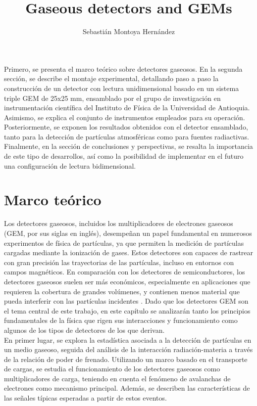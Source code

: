 \documentclass{article}
\title{\textbf{Gaseous detectors and GEMs} }
\author{Sebastián Montoya Hernández}
\begin{document}
\maketitle 
\setcounter{section}{0}
\noindent Primero, se presenta el marco teórico sobre detectores gaseosos. En la segunda sección, se describe el montaje experimental, detallando paso a paso la construcción de un detector con lectura unidimensional basado en un sistema triple GEM de 25x25 mm, ensamblado por el grupo de investigación en instrumentación científica del Instituto de Física de la Universidad de Antioquia. Asimismo, se explica el conjunto de instrumentos empleados para su operación.\\

\noindent Posteriormente, se exponen los resultados obtenidos con el detector ensamblado, tanto para la detección de partículas atmosféricas como para fuentes radiactivas. Finalmente, en la sección de conclusiones y perspectivas, se resalta la importancia de este tipo de desarrollos, así como la posibilidad de implementar en el futuro una configuración de lectura bidimensional.

\newpage
\section{Marco teórico}

\noindent Los detectores gaseosos, incluidos los multiplicadores de electrones gaseosos (GEM, por sus siglas en inglés), desempeñan un papel fundamental en numerosos experimentos de física de partículas, ya que permiten la medición de partículas cargadas mediante la ionización de gases. Estos detectores son capaces de rastrear con gran precisión las trayectorias de las partículas, incluso en entornos con campos magnéticos. En comparación con los detectores de semiconductores, los detectores gaseosos suelen ser más económicos, especialmente en aplicaciones que requieren la cobertura de grandes volúmenes, y contienen menos material que pueda interferir con las partículas incidentes \cite{sauli2015gaseous}. Dado que los detectores GEM son el tema central de este trabajo, en este capítulo se analizarán tanto los principios fundamentales de la física que rigen sus interacciones y funcionamiento como algunos de los tipos de detectores de los que derivan.\\ 

\noindent En primer lugar, se explora la estadística asociada a la detección de partículas en un medio gaseoso, seguida del análisis de la interacción radiación-materia a través de la relación de poder de frenado. Utilizando un marco basado en el transporte de cargas, se estudia el funcionamiento de los detectores gaseosos como multiplicadores de carga, teniendo en cuenta el fenómeno de avalanchas de electrones como mecanismo principal. Además, se describen las características de las señales típicas esperadas a partir de estos eventos.\\
\end{document}

